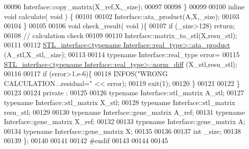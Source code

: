 \begin{DoxyCode}
00096     Interface::copy\_matrix(X\_ref,X,\_size);
00097 
00098   \}
00099 
00100   \textcolor{keyword}{inline} \textcolor{keywordtype}{void} calculate( \textcolor{keywordtype}{void} ) \{
00101 
00102       Interface::ata\_product(A,X,\_size);
00103 
00104   \}
00105 
00106   \textcolor{keywordtype}{void} check\_result( \textcolor{keywordtype}{void} )\{
00107     \textcolor{keywordflow}{if} (\_size>128) \textcolor{keywordflow}{return};
00108     \textcolor{comment}{// calculation check}
00109 
00110     Interface::matrix\_to\_stl(X,resu\_stl);
00111 
00112     \hyperlink{class_s_t_l__interface}{STL\_interface<typename Interface::real\_type>::ata\_product}
      (A\_stl,X\_stl,\_size);
00113 
00114     \textcolor{keyword}{typename} Interface::real\_type error=
00115       \hyperlink{class_s_t_l__interface}{STL\_interface<typename Interface::real\_type>::norm\_diff}
      (X\_stl,resu\_stl);
00116 
00117     \textcolor{keywordflow}{if} (error>1.e-6)\{
00118       INFOS(\textcolor{stringliteral}{"WRONG CALCULATION...residual="} << error);
00119       exit(1);
00120     \}
00121 
00122   \}
00123 
00124 private :
00125 
00126   \textcolor{keyword}{typename} Interface::stl\_matrix A\_stl;
00127   \textcolor{keyword}{typename} Interface::stl\_matrix X\_stl;
00128   \textcolor{keyword}{typename} Interface::stl\_matrix resu\_stl;
00129 
00130   \textcolor{keyword}{typename} Interface::gene\_matrix A\_ref;
00131   \textcolor{keyword}{typename} Interface::gene\_matrix X\_ref;
00132 
00133   \textcolor{keyword}{typename} Interface::gene\_matrix A;
00134   \textcolor{keyword}{typename} Interface::gene\_matrix X;
00135 
00136 
00137   \textcolor{keywordtype}{int} \_size;
00138 
00139 \};
00140 
00141 
00142 \textcolor{preprocessor}{#endif}
00143 
00144 
00145 
\end{DoxyCode}
